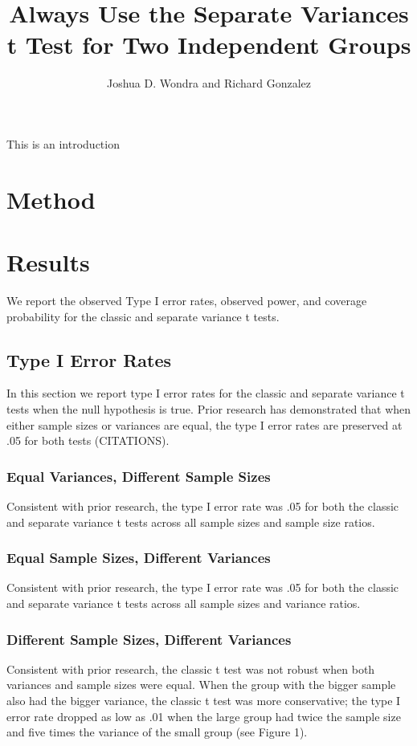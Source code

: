 \documentclass[man]{apa6}\usepackage[]{graphicx}\usepackage[]{color}
\title{Always Use the Separate Variances t Test for Two Independent Groups}
\author{Joshua D. Wondra and Richard Gonzalez}
\affiliation{University of Michigan}
\begin{document}
\maketitle

This is an introduction

\section{Method}


\section{Results}



We report the observed Type I error rates, observed power, and coverage probability for the classic and separate variance t tests.

\subsection{Type I Error Rates}
In this section we report type I error rates for the classic and separate variance t tests when the null hypothesis is true. Prior research has demonstrated that when either sample sizes or variances are equal, the type I error rates are preserved at .05 for both tests (CITATIONS). 

\subsubsection{Equal Variances, Different Sample Sizes}
Consistent with prior research, the type I error rate was .05 for both the classic and separate variance t tests across all sample sizes and sample size ratios.

\subsubsection{Equal Sample Sizes, Different Variances}
Consistent with prior research, the type I error rate was .05 for both the classic and separate variance t tests across all sample sizes and variance ratios.

\subsubsection{Different Sample Sizes, Different Variances}
Consistent with prior research, the classic t test was not robust when both variances and sample sizes were equal. When the group with the bigger sample also had the bigger variance, the classic t test was more conservative; the type I error rate dropped as low as .01 when the large group had twice the sample size and five times the variance of the small group (see Figure 1). 
\end{document}
